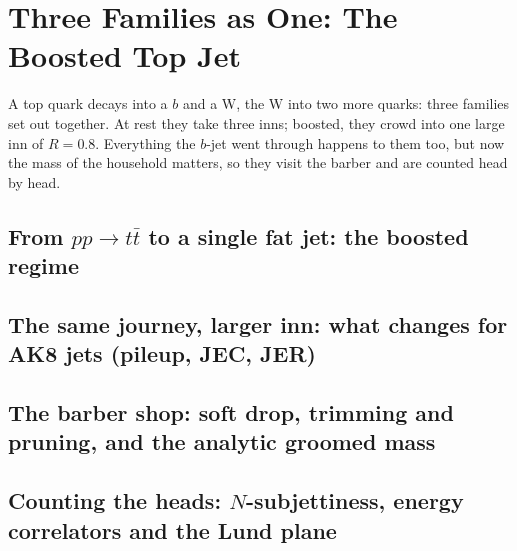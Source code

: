 \chapter{Three Families as One: The Boosted Top Jet}
\label{ch:three_families}

\begin{journeybox}
A top quark decays into a $b$ and a W, the W into two more quarks: three
families set out together. At rest they take three inns; boosted, they crowd
into one large inn of $R=0.8$. Everything the $b$-jet went through happens to
them too, but now the mass of the household matters, so they visit the barber
and are counted head by head.
\end{journeybox}


\section{From $pp\to t\bar t$ to a single fat jet: the boosted regime}
\label{sec:three_families:from_ppto_tbar_t_to_a_single_fat_jet_the}

\section{The same journey, larger inn: what changes for AK8 jets (pileup, JEC, JER)}
\label{sec:three_families:the_same_journey_larger_inn_what_changes}

\section{The barber shop: soft drop, trimming and pruning, and the analytic groomed mass}
\label{sec:three_families:the_barber_shop_soft_drop_trimming_and_p}

\section{Counting the heads: $N$-subjettiness, energy correlators and the Lund plane}
\label{sec:three_families:counting_the_heads_n_subjettiness_energy}

